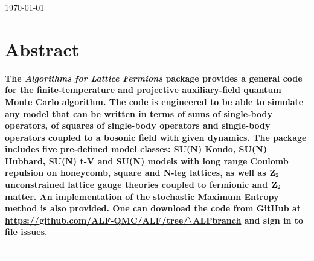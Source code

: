 \begin{center}
\today
\end{center}


\section*{Abstract}
{\bf
The \emph{Algorithms for Lattice Fermions} package provides a general code for the finite-temperature and projective auxiliary-field quantum Monte Carlo algorithm. The code is engineered to be able to simulate any model that can be written in terms of sums of single-body operators, of squares of single-body operators and single-body operators coupled to a bosonic field with given dynamics.   The package includes five pre-defined model classes:  SU(N) Kondo, SU(N) Hubbard, SU(N) t-V and SU(N) models with long range Coulomb repulsion on honeycomb, square and N-leg lattices, as well as $\mathbf{Z}_{2}$  unconstrained lattice gauge theories coupled to fermionic and $\mathbf{Z}_{2}$ matter. An implementation of the stochastic  Maximum Entropy  method is also provided. 
One can download the code from GitHub at \url{https://github.com/ALF-QMC/ALF/tree/\ALFbranch} and sign in to file issues.} \\



\vspace{10pt}
\noindent\rule{\textwidth}{1pt}
\tableofcontents\thispagestyle{fancy}
\noindent\rule{\textwidth}{1pt}
\vspace{10pt}